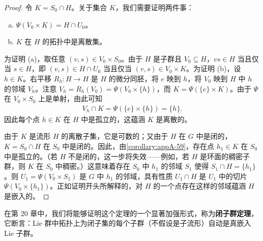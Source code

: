 \documentclass[../../main.tex]{subfiles}
\begin{document}
\begin{proof}
令 $K=S_0\cap H$。关于集合 $K$，我们需要证明两件事：
\begin{enumerate}[(a)]
\item $\Psi(V_0\times K)=H\cap U_0$。
\item $K$ 在 $H$ 的拓扑中是离散集。
\end{enumerate}

为证明 (a)，取任意 $(v,s)\in V_0\times S_0$。由于 $H$ 是子群且 $V_0\subseteq H$，$vs\in H$ 当且仅当 $s\in H$，即 $(v,s)\in H\cap U_0$ 当且仅当 $(v,s)\in V_0\times K$。为证明 (b)，设 $h\in K$。右平移 $R_h\colon H\to H$ 是 $H$ 的微分同胚，将 $e$ 映到 $h$，将 $V_0$ 映到 $H$ 中 $h$ 的邻域 $V_h$。注意 $V_h=R_h(V_0)=\Psi(V_0\times\{h\})$，而 $K=\Psi(\{e\}\times K)$。由于 $\Psi$ 在 $V_0\times S_0$ 上是单射，由此可知
\begin{align*}
V_h\cap K=\Psi(\{e\}\times\{h\})=\{h\}.
\end{align*}
因此每个点 $h\in K$ 在 $H$ 中是孤立的，这蕴涵 $K$ 是离散的。

由于 $K$ 是流形 $H$ 的离散子集，它是可数的；又由于 $H$ 在 $G$ 中是闭的，$K=S_0\cap H$ 在 $S_0$ 中是闭的。因此，由\cref{corollary:appA-59}，存在点 $h_1\in K$ 在 $S_0$ 中是孤立的。（若 $H$ 不是闭的，这一步将失效——例如，若 $H$ 是环面的稠密子群，则 $K$ 在 $S_0$ 中稠密。）这意味着存在 $S_0$ 中 $h_1$ 的邻域 $S_1$ 使得 $S_1\cap H=\{h_1\}$。则 $U_1=\Psi(V_0\times S_1)$ 是 $G$ 中 $h_1$ 的邻域，具有性质 $U_1\cap H$ 是 $U_1$ 中的切片 $\Psi(V_0\times\{h_1\})$。正如证明开头所解释的，对 $H$ 的一个点存在这样的邻域蕴涵 $H$ 是嵌入的。
\end{proof}

在第 20 章中，我们将能够证明这个定理的一个显著加强形式，称为\textbf{闭子群定理}，它断言：Lie 群中拓扑上为闭子集的每个子群（不假设是子流形）自动是真嵌入 Lie 子群。
\end{document}
